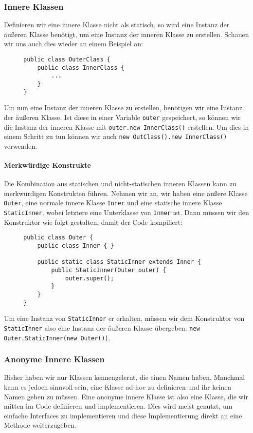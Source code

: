 	\subsubsection{Innere Klassen}
		Definieren wir eine innere Klasse nicht als statisch, so wird eine Instanz der äußeren Klasse benötigt, um eine Instanz der inneren Klasse zu erstellen. Schauen wir uns auch dies wieder an einem Beispiel an:
		\begin{figure}[H]
			\centering
			\begin{lstlisting}
public class OuterClass {
	public class InnerClass {
		...
	}
}
\end{lstlisting}
		\end{figure}
		Um nun eine Instanz der inneren Klasse zu erstellen, benötigen wir eine Instanz der äußeren Klasse. Ist diese in einer Variable \lstinline|outer| gespeichert, so können wir die Instanz der inneren Klasse mit \lstinline|outer.new InnerClass()| erstellen. Um dies in einem Schritt zu tun können wir auch \lstinline|new OutClass().new InnerClass()| verwenden.
		
		\paragraph{Merkwürdige Konstrukte}
			Die Kombination aus statischen und nicht-statischen inneren Klassen kann zu merkwürdigen Konstrukten führen. Nehmen wir an, wir haben eine äußere Klasse \lstinline|Outer|, eine normale innere Klasse \lstinline|Inner| und eine statische innere Klasse \lstinline|StaticInner|, wobei letztere eine Unterklasse von \lstinline|Inner| ist. Dann müssen wir den Konstruktor wie folgt gestalten, damit der Code kompiliert:
			\begin{figure}[H]
				\centering
				\begin{lstlisting}
public class Outer {
	public class Inner { }
	
	public static class StaticInner extends Inner {
		public StaticInner(Outer outer) {
			outer.super();
		}
	}
}
\end{lstlisting}
			\end{figure}
			Um eine Instanz von \lstinline|StaticInner| er erhalten, müssen wir dem Konstruktor von \lstinline|StaticInner| also eine Instanz der äußeren Klasse übergeben: \lstinline|new Outer.StaticInner(new Outer())|.
	
	\subsubsection{Anonyme Innere Klassen}
		Bisher haben wir nur Klassen kennengelernt, die einen Namen haben. Manchmal kann es jedoch sinnvoll sein, eine Klasse ad-hoc zu definieren und ihr keinen Namen geben zu müssen. Eine anonyme innere Klasse ist also eine Klasse, die wir mitten im Code definieren und implementieren. Dies wird meist genutzt, um einfache Interfaces zu implementieren und diese Implementierung direkt an eine Methode weiterzugeben.
		
